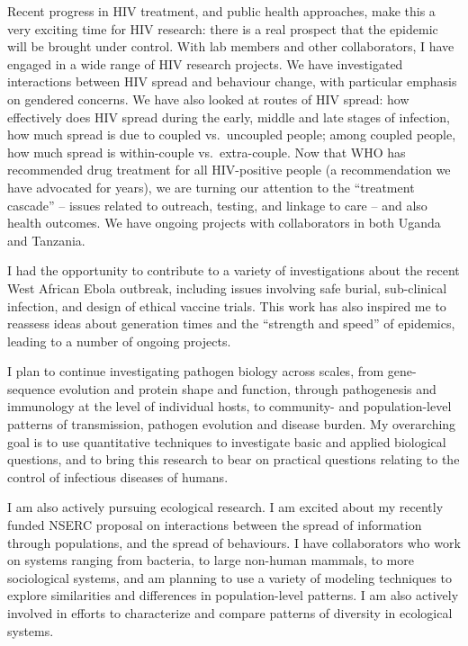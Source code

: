 \documentclass[12pt,a4paper]{article}
\begin{document}
Recent progress in HIV treatment, and public health approaches, make this a very exciting time for HIV research: there is a real prospect that the epidemic will be brought under control. With lab members and other collaborators, I have engaged in a wide range of HIV research projects. We have investigated interactions between HIV spread and behaviour change, with particular emphasis on gendered concerns. We have also looked at routes of HIV spread: how effectively does HIV spread during the early, middle and late stages of infection, how much spread is due to coupled vs.\ uncoupled people; among coupled people, how much spread is within-couple vs.\ extra-couple. Now that WHO has recommended drug treatment for all HIV-positive people (a recommendation we have advocated for years), we are turning our attention to the ``treatment cascade'' -- issues related to outreach, testing, and linkage to care -- and also health outcomes. We have ongoing projects with collaborators in both Uganda and Tanzania. 

I had the opportunity to contribute to a variety of investigations about the recent West African Ebola outbreak, including issues involving safe burial, sub-clinical infection, and design of ethical vaccine trials. This work has also inspired me to reassess ideas about generation times and the ``strength and speed'' of epidemics, leading to a number of ongoing projects.

I plan to continue investigating pathogen biology across scales, from gene-sequence evolution and protein shape and function, through pathogenesis and immunology at the level of individual hosts, to community- and population-level patterns of transmission, pathogen evolution and disease burden.  My overarching goal is to use quantitative techniques to investigate basic and applied biological questions, and to bring this research to bear on practical questions relating to the control of infectious diseases of humans.

I am also actively pursuing ecological research. I am excited about my recently funded NSERC proposal on interactions between the spread of information through populations, and the spread of behaviours. I have collaborators who work on systems ranging from bacteria, to large non-human mammals, to more sociological systems, and am planning to use a variety of modeling techniques to explore similarities and differences in population-level patterns. I am also actively involved in efforts to characterize and compare patterns of diversity in ecological systems.
\end{document}
